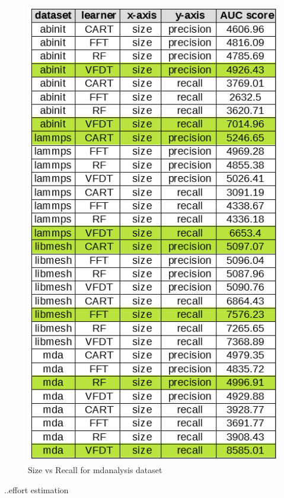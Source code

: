 \documentclass[sigplan]{acmart}\settopmatter{printfolios=true,printccs=false,printacmref=false}
\begin{document}
\begin{figure}[h]
	\includegraphics[width=\linewidth]{fig/auc-size.png}
	\caption{Size vs Recall for mdanalysis dataset}
	\label{fig:auc-size}
\end{figure}

..effort estimation
\end{document}

